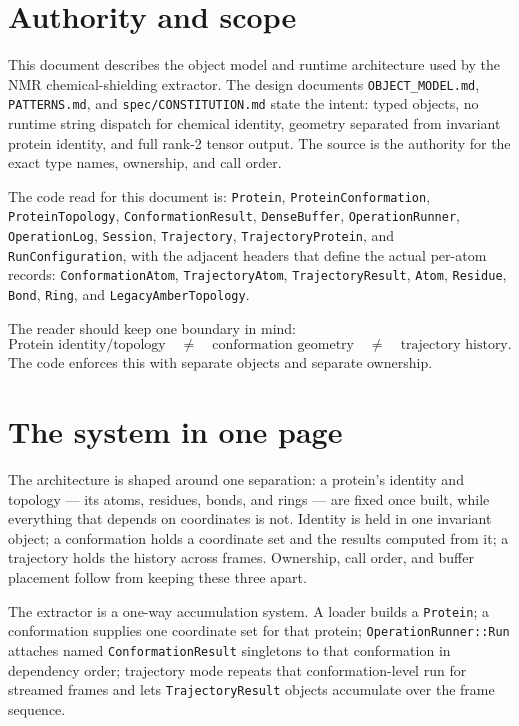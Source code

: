 \documentclass[11pt]{article}
\newcommand{\code}[1]{\texttt{#1}}
\begin{document}
\tableofcontents
\clearpage

\section{Authority and scope}

This document describes the object model and runtime architecture used by the
NMR chemical-shielding extractor. The design documents
\code{OBJECT\_MODEL.md}, \code{PATTERNS.md}, and
\code{spec/CONSTITUTION.md} state the intent: typed objects, no runtime string
dispatch for chemical identity, geometry separated from invariant protein
identity, and full rank-2 tensor output. The source is the authority for the
exact type names, ownership, and call order.

The code read for this document is:
\code{Protein}, \code{ProteinConformation}, \code{ProteinTopology},
\code{ConformationResult}, \code{DenseBuffer}, \code{OperationRunner},
\code{OperationLog}, \code{Session}, \code{Trajectory},
\code{TrajectoryProtein}, and \code{RunConfiguration}, with the adjacent
headers that define the actual per-atom records:
\code{ConformationAtom}, \code{TrajectoryAtom}, \code{TrajectoryResult},
\code{Atom}, \code{Residue}, \code{Bond}, \code{Ring}, and
\code{LegacyAmberTopology}.

The reader should keep one boundary in mind:
\[
  \text{Protein identity/topology}
  \quad \ne \quad
  \text{conformation geometry}
  \quad \ne \quad
  \text{trajectory history}.
\]
The code enforces this with separate objects and separate ownership.

\section{The system in one page}

The architecture is shaped around one separation: a protein's identity and topology ---
its atoms, residues, bonds, and rings --- are fixed once built, while everything that
depends on coordinates is not. Identity is held in one invariant object; a conformation
holds a coordinate set and the results computed from it; a trajectory holds the history
across frames. Ownership, call order, and buffer placement follow from keeping these
three apart.

The extractor is a one-way accumulation system. A loader builds a
\code{Protein}; a conformation supplies one coordinate set for that protein;
\code{OperationRunner::Run} attaches named \code{ConformationResult}
singletons to that conformation in dependency order; trajectory mode repeats
that conformation-level run for streamed frames and lets
\code{TrajectoryResult} objects accumulate over the frame sequence.
\end{document}
